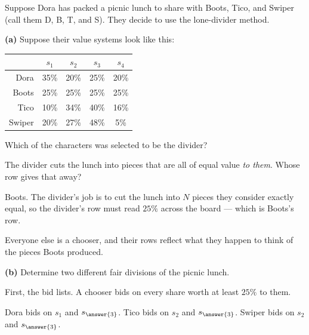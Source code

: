 \documentclass[12pt]{ximera}
\begin{document}
\begin{problem}
Suppose Dora has packed a picnic lunch to share with Boots, Tico, and Swiper (call
them D, B, T, and S). They decide to use the lone-divider method.

\begin{prompt}
\textbf{(a)} Suppose their value systems look like this:

\begin{center}
\begin{tabular}{r|c|c|c|c|}
& $s_1$ & $s_2$ & $s_3$ & $s_4$ \\\hline
Dora   & 35\% & 20\% & 25\% & 20\% \\\hline
Boots  & 25\% & 25\% & 25\% & 25\% \\\hline
Tico   & 10\% & 34\% & 40\% & 16\% \\\hline
Swiper & 20\% & 27\% & 48\% &  5\% \\\hline
\end{tabular}
\end{center}

Which of the characters was selected to be the divider?

\begin{multipleChoice}
\end{multipleChoice}

\begin{hint}
The divider cuts the lunch into pieces that are all of equal value \emph{to them}.
Whose row gives that away?
\end{hint}

\begin{feedback}
Boots. The divider's job is to cut the lunch into $N$ pieces they consider exactly
equal, so the divider's row must read $25\%$ across the board --- which is Boots's row.

Everyone else is a chooser, and their rows reflect what they happen to think of the
pieces Boots produced.
\end{feedback}
\end{prompt}

\begin{prompt}
\textbf{(b)} Determine two different fair divisions of the picnic lunch.

First, the bid lists. A chooser bids on every share worth at least $25\%$ to them.

Dora bids on $s_1$ and $s_{\answer{3}}$. \quad
Tico bids on $s_2$ and $s_{\answer{3}}$. \quad
Swiper bids on $s_2$ and $s_{\answer{3}}$.


\end{prompt}
\end{problem}
\end{document}
